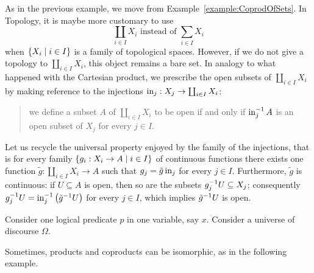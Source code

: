 \begin{example}
  As in the previous example, we move from
  Example~\ref{example:CoprodOfSets}. In Topology, it is maybe more
  customary to use
  \[\coprod_{i \in I} X_i \text{ instead of } \sum_{i \in I} X_i\]
  when \(\left\{X_i \mid i \in I\right\}\) is a family of topological spaces. However,
  if we do not give a topology to \(\coprod_{i \in I} X_i\), this object remains
  a bare set. In analogy to what happened with the Cartesian product, we
  prescribe the open subsets of \(\coprod_{i \in I} X_i\) by making reference to
  the injections \(\operatorname{in}_j : X_j \to \coprod_{i \in I} X_i\):
  \begin{quotation}
    we define a subset \(A\) of \(\coprod_{i \in I} X_i\) to be open if and only
    if \(\operatorname{in}_j^{-1} A\) is an open subset of \(X_j\) for every
    \(j \in I\).
  \end{quotation}
  Let us recycle the universal property enjoyed by the family of the
  injections, that is for every family
  \(\left\{g_i : X_i \to A \mid i \in I\right\}\) of continuous functions there exists
  one function \(\tilde g : \coprod_{i \in I} X_i \to A\) such that
  \(g_j = \tilde g \operatorname{in}_j\) for every \(j \in I\). Furthermore,
  \(\tilde g\) is continuous: if \(U \subseteq A\) is open, then so are the
  subsets \(g_j^{-1} U \subseteq X_j\); consequently
  \(g_j^{-1} U = \operatorname{in}_j^{-1} \left(\tilde g^{-1} U\right)\) for every
  \(j \in I\), which implies \(\tilde g^{-1} U\) is open.
\end{example}

\begin{example}
  Consider one logical predicate \(p\) in one variable, say
  \(x\). Consider a universe of discourse \(\Omega\). \YetToBeTeXed{}
\end{example}

Sometimes, products and coproducts can be isomorphic, as in the
following example.

\begin{example}
\end{example}

